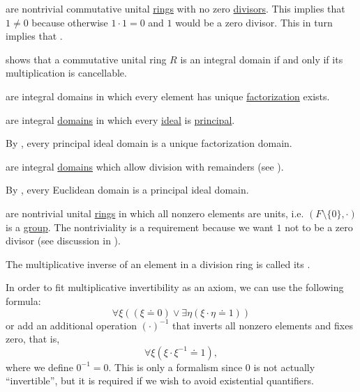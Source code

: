 \begin{definition}
\begin{thmenum}[resume=def:semiring]
      are nontrivial commutative unital \hyperref[def:semiring/commutative_unital_ring]{rings} with no zero \hyperref[def:semiring_division]{divisors}. This implies that \( 1 \neq 0 \) because otherwise \( 1 \cdot 1 = 0 \) and \( 1 \) would be a zero divisor. This in turn implies that .

     shows that a commutative unital ring \( R \) is an integral domain if and only if its multiplication is cancellable.

      are integral domains in which every element has unique \hyperref[def:factorization_in_ring]{factorization} exists.

      are integral \hyperref[def:semiring/integral_domain]{domains} in which every \hyperref[def:semiring_ideal]{ideal} is \hyperref[def:principal_ideal]{principal}.

    By , every principal ideal domain is a unique factorization domain.

      are integral \hyperref[def:semiring/integral_domain]{domains} which allow division with remainders (see ).

    By , every Euclidean domain is a principal ideal domain.

      are nontrivial unital \hyperref[def:semiring/unital_ring]{rings} in which all nonzero elements are units, i.e. \( (F \setminus \{ 0 \}, \cdot) \) is a \hyperref[def:group]{group}. The nontriviality is a requirement because we want \( 1 \) not to be a zero divisor (see discussion in ).

    The multiplicative inverse of an element in a division ring is called its .

    In order to fit multiplicative invertibility as an axiom, we can use the following formula:
    \begin{equation*}
      \forall \xi ((\xi \doteq 0) \lor \exists \eta (\xi \cdot \eta \doteq 1))
    \end{equation*}
    or add an additional operation \( (\cdot)^{-1} \) that inverts all nonzero elements and fixes zero, that is,
    \begin{equation*}
      \forall \xi (\xi \cdot \xi^{-1} \doteq 1),
    \end{equation*}
    where we define \( 0^{-1} = 0 \). This is only a formalism since \( 0 \) is not actually \enquote{invertible}, but it is required if we wish to avoid existential quantifiers.


\end{thmenum}
\end{definition}
